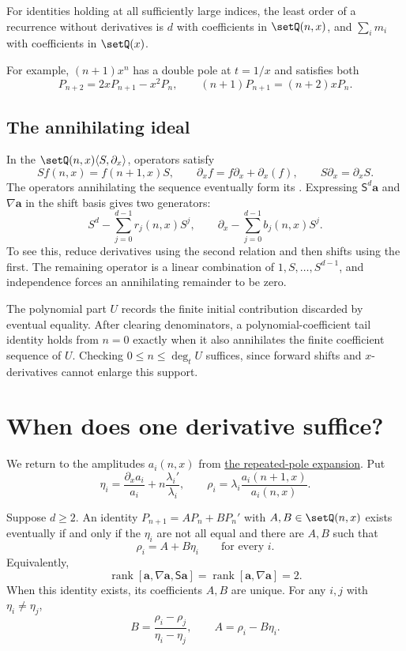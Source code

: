 For identities holding at all sufficiently large indices, the least order
of a recurrence without derivatives is $d$ with coefficients in $\setQ(n,x)$,
and $\sum_i m_i$ with coefficients in $\setQ(x)$.

For example, $(n+1)x^n$ has a double pole at $t=1/x$ and satisfies both
\[
 P_{n+2}=2xP_{n+1}-x^2P_n,
 \qquad (n+1)P_{n+1}=(n+2)xP_n.
\]

\subsection[recurrenceAnnihilatingIdeal]{The annihilating ideal}

In the  $\setQ(n,x)\langle S,\partial_x\rangle$,
operators satisfy
\[
 S f(n,x)=f(n+1,x)S,\qquad
 \partial_x f=f\partial_x+\partial_x(f),\qquad S\partial_x=\partial_xS.
\]
The operators annihilating the sequence eventually form its
. Expressing $\mathsf S^d\mathbf{a}$ and $\nabla\mathbf{a}$ in
the shift basis gives two generators:
\[
 S^d-\sum_{j=0}^{d-1}r_j(n,x)S^j,\qquad
 \partial_x-\sum_{j=0}^{d-1}b_j(n,x)S^j.
\]
To see this, reduce derivatives using the second relation and then shifts
using the first. The remaining operator is a linear combination of
$1,S,\dotsc,S^{d-1}$, and independence forces an annihilating remainder
to be zero.

The polynomial part $U$ records the finite initial contribution discarded
by eventual equality. After clearing denominators, a polynomial-coefficient
tail identity holds from $n=0$ exactly when it also annihilates the finite
coefficient sequence of $U$. Checking $0\leq n\leq\deg_tU$ suffices,
since forward shifts and $x$-derivatives cannot enlarge this support.

\section[firstDerivativeCriterion]{When does one derivative suffice?}

We return to the amplitudes $a_i(n,x)$ from
\hyperref[recurrenceSpectralModel]{the repeated-pole expansion}. Put
\[
 \eta_i=\frac{\partial_xa_i}{a_i}
       +n\frac{\lambda_i'}{\lambda_i},\qquad
 \rho_i=\lambda_i\frac{a_i(n+1,x)}{a_i(n,x)}.
\]

\begin{proposition}
Suppose $d\geq2$. An identity $P_{n+1}=AP_n+BP_n'$ with
$A,B\in\setQ(n,x)$ exists eventually if and only if the $\eta_i$ are
not all equal and there are $A,B$ such that
\[
 \rho_i=A+B\eta_i\qquad\text{for every }i.
\]
Equivalently,
\[
 \operatorname{rank}[\mathbf{a},\nabla\mathbf{a},\mathsf S\mathbf{a}]
 =\operatorname{rank}[\mathbf{a},\nabla\mathbf{a}]=2.
\]
When this identity exists, its coefficients $A,B$ are unique.
For any $i,j$ with $\eta_i\ne\eta_j$,
\[
 B=\frac{\rho_i-\rho_j}{\eta_i-\eta_j},\qquad
 A=\rho_i-B\eta_i.
\]
\end{proposition}

